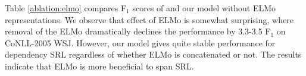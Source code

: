\documentclass[letterpaper]{article} %
\begin{document}
Table \ref{ablation:elmo} compares F$_1$ scores of \citeauthor{he2018jointly}  and our model without ELMo representations. We observe that effect of ELMo is somewhat surprising, where removal of the ELMo dramatically declines the performance by 3.3-3.5 F$_1$ on CoNLL-2005 WSJ. However, our model gives quite stable performance for dependency SRL regardless of whether ELMo is concatenated or not. The results indicate that ELMo is more beneficial to span SRL.

%
\end{document}
